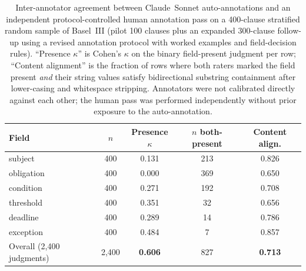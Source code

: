\documentclass{article}
\begin{document}
\begin{table}[!htbp]
\caption{Inter-annotator agreement between Claude~Sonnet auto-annotations
and an independent protocol-controlled human annotation pass on a
400-clause stratified random sample of Basel~III (pilot 100 clauses
plus an expanded 300-clause follow-up using a revised annotation
protocol with worked examples and field-decision rules).
``Presence $\kappa$'' is Cohen's $\kappa$ on the binary field-present
judgment per row; ``Content alignment'' is the fraction of rows where
both raters marked the field present \emph{and} their string values
satisfy bidirectional substring containment after lower-casing and
whitespace stripping. Annotators were not calibrated directly against
each other; the human pass was performed independently without prior
exposure to the auto-annotation.}
\centering
\small
\begin{tabular}{lcccc}
\toprule
Field & $n$ & Presence $\kappa$ & $n$ both-present & Content align. \\
\midrule
subject     & 400 & 0.131 & 213 & 0.826 \\
obligation  & 400 & 0.000 & 369 & 0.650 \\
condition   & 400 & 0.271 & 192 & 0.708 \\
threshold   & 400 & 0.351 & 32  & 0.656 \\
deadline    & 400 & 0.289 & 14  & 0.786 \\
exception   & 400 & 0.484 & 7   & 0.857 \\
\midrule
Overall (2{,}400 judgments) & 2{,}400 & \textbf{0.606} & 827 & \textbf{0.713} \\
\bottomrule
\end{tabular}
\label{tab:kappa}
\end{table}
\end{document}
